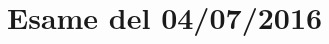 \documentclass[\main/main.tex]{subfiles}
\begin{document}
\section{Esame del 04/07/2016}

\clearpage

\clearpage

\end{document}
